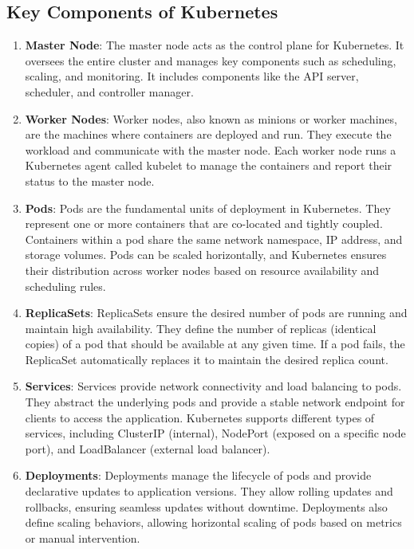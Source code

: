 \subsection*{Key Components of Kubernetes}
\begin{enumerate}
    \item \textbf{Master Node}: The master node acts as the control plane for Kubernetes. It oversees the entire cluster and manages key components such as scheduling, scaling, and monitoring. It includes components like the API server, scheduler, and controller manager.

    \item \textbf{Worker Nodes}: Worker nodes, also known as minions or worker machines, are the machines where containers are deployed and run. They execute the workload and communicate with the master node. Each worker node runs a Kubernetes agent called kubelet to manage the containers and report their status to the master node.

    \item \textbf{Pods}: Pods are the fundamental units of deployment in Kubernetes. They represent one or more containers that are co-located and tightly coupled. Containers within a pod share the same network namespace, IP address, and storage volumes. Pods can be scaled horizontally, and Kubernetes ensures their distribution across worker nodes based on resource availability and scheduling rules.

    \item \textbf{ReplicaSets}: ReplicaSets ensure the desired number of pods are running and maintain high availability. They define the number of replicas (identical copies) of a pod that should be available at any given time. If a pod fails, the ReplicaSet automatically replaces it to maintain the desired replica count.

    \item \textbf{Services}: Services provide network connectivity and load balancing to pods. They abstract the underlying pods and provide a stable network endpoint for clients to access the application. Kubernetes supports different types of services, including ClusterIP (internal), NodePort (exposed on a specific node port), and LoadBalancer (external load balancer).

    \item \textbf{Deployments}: Deployments manage the lifecycle of pods and provide declarative updates to application versions. They allow rolling updates and rollbacks, ensuring seamless updates without downtime. Deployments also define scaling behaviors, allowing horizontal scaling of pods based on metrics or manual intervention.

\end{enumerate}


